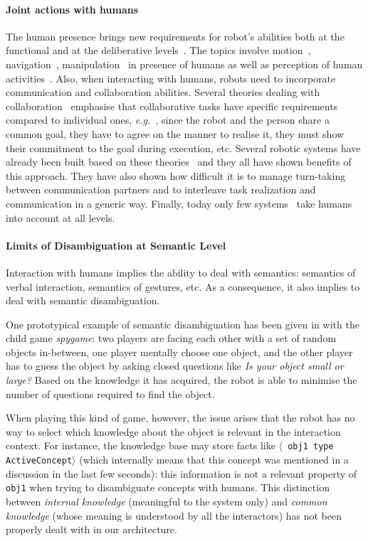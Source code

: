 \documentclass[preprint,3p,times]{elsarticle}
\newcommand{\concept}[1]{{\small \texttt{#1}}}
\newcommand{\stmt}[1]{{\footnotesize \tt $\langle$ #1\relax$\rangle$}}
\newcommand{\eg}{{\textit{e.g.\ }}}
\begin{document}
\paragraph{Joint actions with humans}\label{sec:soa}
The human presence brings new requirements for robot's abilities both
at the functional and at the deliberative levels~\cite{Klein2004}. The
topics involve motion~\cite{Kulic2007,Berg2004,Madhava2006},
navigation~\cite{Althaus2004,Sisbot2007}, manipulation~\cite{Kemp2007}
in presence of humans as well as perception of human
activities~\cite{Breazeal2001,Burger2008}. Also, when
interacting with humans, robots need to incorporate communication and
collaboration abilities. Several theories dealing with
collaboration~\cite{Cohen1991,Grosz1996,Clark1996} emphasise that
collaborative tasks have specific requirements compared to individual
ones, \eg, since the robot and the person share a common goal, they
have to agree on the manner to realise it, they must show their
commitment to the goal during execution, etc. Several robotic systems
have already been built based on these
theories~\cite{Rich1997,Sidner2005,Breazeal2003} and they
all have shown benefits of this approach. They have also shown how
difficult it is to manage turn-taking between communication partners
and to interleave task realization and communication in a generic
way. Finally, today only few
systems~\cite{Fong2006,Breazeal2003,Sisbot2008} take humans into
account at all levels.


\paragraph{Limits of Disambiguation at Semantic Level}

Interaction with humans implies the ability to deal with semantics: semantics of
verbal interaction, semantics of gestures, etc.  As a consequence, it also
implies to deal with semantic disambiguation.

One prototypical example of semantic disambiguation has been given in
\cite{Ros2010b} with the child game \emph{spygame}: two players are facing
each other with a set of random objects in-between, one player mentally choose
one object, and the other player has to guess the object by asking closed
questions like \emph{Is your object small or large?} Based on the knowledge it
has acquired, the robot is able to minimise the number of questions required to
find the object.

When playing this kind of game, however, the issue arises that the robot has no
way to select which knowledge about the object is relevant in the interaction
context. For instance, the knowledge base may store facts like \stmt{obj1 type
ActiveConcept} (which internally means that this concept was mentioned in a
discussion in the last few seconds): this information is not a relevant
property of \concept{obj1} when trying to disambiguate concepts with humans.
This distinction between \emph{internal knowledge} (meaningful to
the system only) and \emph{common knowledge} (whose meaning is understood by
all the interactors) has not been properly dealt with in our architecture.
\end{document}
